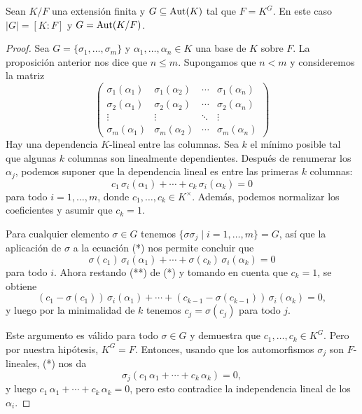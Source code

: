 \begin{lema}
  \label{lema:automorphism-group-and-degree}
  Sean $K/F$ una extensión finita y $G \subseteq \operatorname{Aut} (K)$ tal que $F = K^G$.
  En este caso $|G| = [K : F]$ y $G = \operatorname{Aut} (K/F)$.

  \begin{proof}
    Sea $G = \{ \sigma_1, \ldots, \sigma_m \}$ y
    $\alpha_1, \ldots, \alpha_n \in K$ una base de $K$ sobre $F$.
    La proposición anterior nos dice que $n \le m$. Supongamos que
    $n < m$ y consideremos la matriz
    \[ \begin{pmatrix}
      \sigma_1 (\alpha_1) & \sigma_1 (\alpha_2) & \cdots & \sigma_1 (\alpha_n) \\
      \sigma_2 (\alpha_1) & \sigma_2 (\alpha_2) & \cdots & \sigma_2 (\alpha_n) \\
      \vdots & \vdots & \ddots & \vdots \\
      \sigma_m (\alpha_1) & \sigma_m (\alpha_2) & \cdots & \sigma_m (\alpha_n)
    \end{pmatrix} \]
    Hay una dependencia $K$-lineal entre las columnas. Sea $k$ el mínimo posible    
    tal que algunas $k$ columnas son linealmente dependientes. Después de
    renumerar los $\alpha_j$, podemos suponer que la dependencia lineal es entre
    las primeras $k$ columnas:
    \[ \tag{*} c_1\,\sigma_i (\alpha_1) + \cdots + c_k\,\sigma_i (\alpha_k) = 0 \]
    para todo $i = 1,\ldots,m$, donde $c_1,\ldots,c_k \in K^\times$. Además, podemos
    normalizar los coeficientes y asumir que $c_k = 1$.

    Para cualquier elemento $\sigma \in G$ tenemos
    $\{ \sigma\sigma_j \mid i = 1,\ldots,m \} = G$,
    así que la aplicación de $\sigma$ a la ecuación (*) nos
    permite concluir que
    \[ \tag{**} \sigma (c_1)\,\sigma_i (\alpha_1) + \cdots + \sigma(c_k)\,\sigma_i (\alpha_k) = 0 \]
    para todo $i$. Ahora restando (**) de (*) y tomando en cuenta que $c_k = 1$,
    se obtiene
    \[ (c_1 - \sigma (c_1))\,\sigma_i (\alpha_1) + \cdots + (c_{k-1} - \sigma (c_{k-1}))\,\sigma_i (\alpha_k) = 0, \]
    y luego por la minimalidad de $k$ tenemos $c_j = \sigma (c_j)$ para todo $j$.

    Este argumento es válido para todo $\sigma \in G$ y demuestra que
    $c_1,\ldots,c_k \in K^G$. Pero por nuestra hipótesis, $K^G = F$. Entonces, usando
    que los automorfismos $\sigma_j$ son $F$-lineales, (*) nos da
    $$\sigma_j (c_1\,\alpha_1 + \cdots + c_k\,\alpha_k) = 0,$$
    y luego $c_1\,\alpha_1 + \cdots + c_k\,\alpha_k = 0$, pero esto contradice
    la independencia lineal de los $\alpha_i$.
  \end{proof}
\end{lema}

